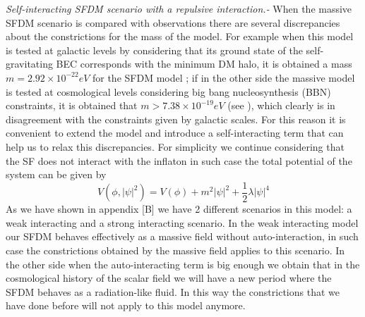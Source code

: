 \documentclass[amssymb,twocolumn,prd,nofootinbib,showpacs]{revtex4-1}
\begin{document}
\textit{Self-interacting SFDM scenario with a repulsive interaction.-} When the massive SFDM scenario is compared with observations there are several discrepancies about the constrictions for the mass of the model. For example when this model is tested at galactic levels by considering that its ground state of the self-gravitating BEC corresponds with the minimum DM halo, it is obtained a mass $m=2.92\times 10^{-22}eV$ for the SFDM model \cite{massconst1,SFphi42}; if in the other side the massive model is tested at cosmological levels considering big bang nucleosynthesis (BBN) constraints, it is obtained that $m>7.38\times 10^{-19}eV$ (see \cite{SFphi41,SFphi42}), which clearly is in disagreement with the constraints given by galactic scales. For this reason it is convenient to extend the model and introduce a self-interacting term that can help us to relax this discrepancies. For simplicity we continue considering that the SF does not interact with the inflaton in such case the total potential of the system can be given by
\begin{equation}
V(\phi,|\psi|^2)=V(\phi)+m^2|\psi|^2+\frac{1}{2}\lambda|\psi|^4
\end{equation}
As we have shown in appendix [B] we have 2 different scenarios in this model: a weak interacting and a strong interacting scenario. In the weak interacting model our SFDM behaves effectively as a massive field without auto-interaction, in such case the constrictions obtained by the massive field applies to this scenario. In the other side when the auto-interacting term is big enough we obtain that in the cosmological history of the scalar field we will have a new period where the SFDM behaves as a radiation-like fluid. In this way the constrictions that we have done before will not apply to this model anymore.
\end{document}

